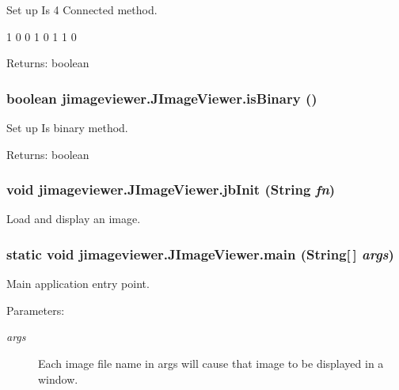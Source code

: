 Set up Is 4 Connected method. 

1 0 0 1 0 1 1 0 \begin{Desc}
\item[Returns:]boolean \end{Desc}
\subsubsection{\setlength{\rightskip}{0pt plus 5cm}boolean jimageviewer.JImage\-Viewer.is\-Binary ()}\label{classjimageviewer_1_1_j_image_viewer_7a8fa049abbefcf40fe2aaf49c668d6a}


Set up Is binary method. 

\begin{Desc}
\item[Returns:]boolean \end{Desc}
\subsubsection{\setlength{\rightskip}{0pt plus 5cm}void jimageviewer.JImage\-Viewer.jb\-Init (String {\em fn})\hspace{0.3cm}{\tt  [private]}}\label{classjimageviewer_1_1_j_image_viewer_79aff348a8d302f5b09ca943bdc639e5}


Load and display an image. 

\subsubsection{\setlength{\rightskip}{0pt plus 5cm}static void jimageviewer.JImage\-Viewer.main (String[$\,$] {\em args})\hspace{0.3cm}{\tt  [static]}}\label{classjimageviewer_1_1_j_image_viewer_d906f358c6ec32aac7b9530c80f216e9}


Main application entry point. 

\begin{Desc}
\item[Parameters:]
\begin{description}
\item[{\em args}]Each image file name in args will cause that image to be displayed in a window. \end{description}
\end{Desc}
